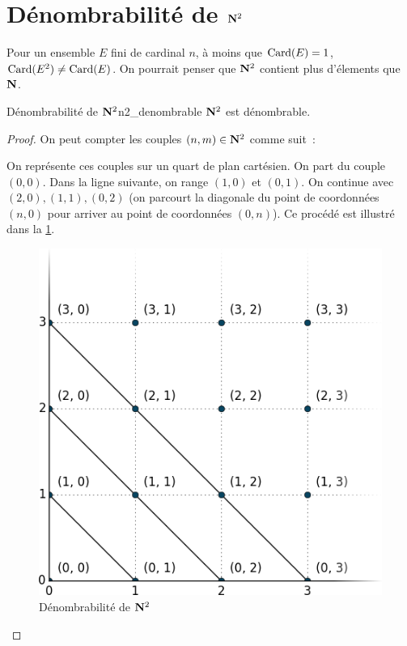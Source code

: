 \documentclass[a4paper,french,final]{memoir}
\begin{document}
\section{\texorpdfstring{Dénombrabilité de $\mathbf{N}^2$}{Dénombrabilité de N²}}
Pour un ensemble $E$ fini de cardinal $n$, à moins que $\operatorname{Card}(E) = 1$, $\operatorname{Card}(E^2) \neq \operatorname{Card}(E)$. On pourrait penser que $\mathbf{N}^2 $ contient plus d'élements que $\mathbf{N}$.

\begin{theoremb}{Dénombrabilité de $\mathbf{N}^2$}{n2_denombrable}
	$\mathbf{N}^2$ est dénombrable.
\end{theoremb}

\begin{proof}
	On peut compter les couples $(n,m) \in \mathbf{N}^2$ comme suit~: \par On représente ces couples sur un quart de plan cartésien.
	On part du couple $(0, 0)$. Dans la ligne suivante, on range $(1,0) $ et $(0,1)$. On continue avec $(2,0), (1,1), (0,2)$ (on parcourt la diagonale du point de coordonnées $(n,0)$ pour arriver au point de coordonnées $(0,n)$). Ce procédé est illustré dans la  \cref{fig:n_croix_n}.
	\begin{figure}[htb]
		\centering
		\includegraphics[scale=0.3]{n_croix_n.png}
		\caption{Dénombrabilité de $\mathbf{N}^2$}
		\label{fig:n_croix_n}
	\end{figure}


\end{proof}
\end{document}
